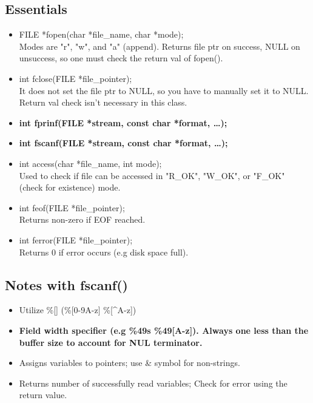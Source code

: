 \documentclass{article}
\begin{document}
\subsection{Essentials}
\begin{itemize}
    \item FILE *fopen(char *file\_name, char *mode);\\
    Modes are "r", "w", and "a" (append). Returns file ptr on success, NULL on unsuccess, so one must check the return val of fopen().
    \item int fclose(FILE *file\_pointer);\\
    It does not set the file ptr to NULL, so you have to manually set it to NULL. Return val check isn't necessary in this class.
    \item \textbf{int fprinf(FILE *stream, const char *format, \dots);}
    \item \textbf{int fscanf(FILE *stream, const char *format, \dots);}
    \item int access(char *file\_name, int mode);\\
    Used to check if file can be accessed in "R\_OK", "W\_OK", or "F\_OK" (check for existence) mode.
    \item int feof(FILE *file\_pointer);\\
    Returns non-zero if EOF reached.
    \item int ferror(FILE *file\_pointer);\\
    Returns 0 if error occurs (e.g disk space full).
\end{itemize}

\subsection{Notes with fscanf()}
\begin{itemize}
    \item Utilize \%[] (\%[0-9A-z] \%[\^{}A-z])
    \item \textbf{Field width specifier (e.g \%49s \%49[A-z]). Always one less than the buffer size to account for NUL terminator.}
    \item Assigns variables to pointers; use \& symbol for non-strings.
    \item Returns number of successfully read variables; Check for error using the return value.
\end{itemize}
\end{document}
